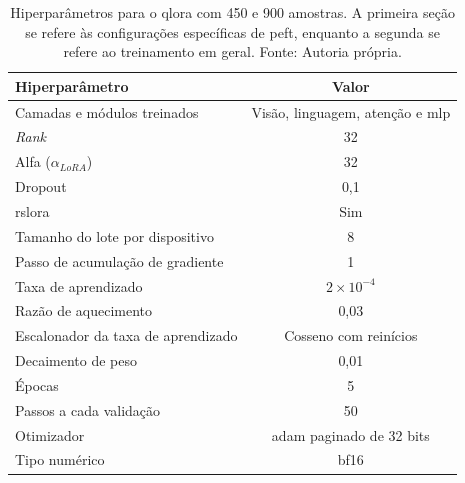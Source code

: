 \begin{table}[ht]
    \centering
    \begin{tabular}{l|c}
        \hline
        Hiperparâmetro                             & Valor                                  \\ \hline
        Camadas e módulos treinados                & Visão, linguagem, atenção e \ac{mlp}   \\
        \textit{Rank}                              & 32                                     \\
        Alfa (\begin{math}\alpha_{LoRA}\end{math}) & 32                                     \\
        Dropout                                    & 0,1                                    \\
        \ac{rslora}                                & Sim                                    \\ \hline
        Tamanho do lote por dispositivo            & 8                                      \\
        Passo de acumulação de gradiente           & 1                                      \\
        Taxa de aprendizado                        & \begin{math}2 \times 10^{-4}\end{math} \\
        Razão de aquecimento                       & 0,03                                   \\
        Escalonador da taxa de aprendizado         & Cosseno com reinícios                  \\
        Decaimento de peso                         & 0,01                                   \\
        Épocas                                     & 5                                      \\
        Passos a cada validação                    & 50                                     \\
        Otimizador                                 & \ac{adam} paginado de 32 bits          \\
        Tipo numérico                              & \ac{bf16}                              \\ \hline
    \end{tabular}
    \caption{Hiperparâmetros para o \ac{qlora} com 450 e 900 amostras. A primeira seção se refere às
    configurações
    específicas de \ac{peft}, enquanto a
    segunda se refere ao treinamento em geral. Fonte: Autoria própria.}
    \label{tab:qlora_500_config}
\end{table}

